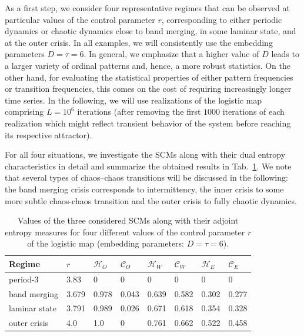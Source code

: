 \documentclass[aip,cha,reprint,nofootinbib]{revtex4-1}
\begin{document}
As a first step, we consider four representative regimes that can be observed at particular values of the control parameter $r$, corresponding to either periodic dynamics or chaotic dynamics close to band merging, in some laminar state, and at the outer crisis. In all examples, we will consistently use the embedding parameters $D = \tau = 6$. In general, we emphasize that a higher value of $D$ leads to a larger variety of ordinal patterns and, hence, a more robust statistics. On the other hand, for evaluating the statistical properties of either pattern frequencies or transition frequencies, this comes on the cost of requiring increasingly longer time series. In the following, we will use realizations of the logistic map comprising $L = 10^6$ iterations (after removing the first $1000$ iterations of each realization which might reflect transient behavior of the system before reaching its respective attractor). 

For all four situations, we investigate the SCMs along with their dual entropy characteristics in detail and summarize the obtained results in Tab.~\ref{tableLog}. We note that several types of chaos--chaos transitions will be discussed in the following: the band merging crisis corresponds to intermittency, the inner crisis to some more subtle chaos-chaos transition and the outer crisis to fully chaotic dynamics. 
\begin{table}[htb]
    {\begin{tabular}{l  l  l  l  l  l  l  l}
    \hline
    Regime & $r$      & $\mathcal{H}_O$ & $\mathcal{C}_O$ & $\mathcal{H}_W$ & $\mathcal{C}_W$ & $\mathcal{H}_E$   & $\mathcal{C}_E$  \\
    \hline
    period-3      & 3.83 & 0 & 0 & 0 & 0 & 0 & 0 \\
    \hline
    band merging    & 3.679 & 0.978 & 0.043 & 0.639 & 0.582 & 0.302 & 0.277  \\
    \hline
    laminar state    & 3.791 & 0.989 & 0.026 & 0.671 & 0.618 & 0.354 & 0.328 \\
    \hline
    outer crisis  & 4.0 & 1.0 & 0 & 0.761 & 0.662 & 0.522 & 0.458 \\
    \hline
    \end{tabular}}
   \caption{Values of the three considered SCMs along with their adjoint entropy measures for four different values of the control parameter $r$ of the logistic map (embedding parameters: $D = \tau = 6$).   \label{tableLog}}    
\end{table}
\end{document}
